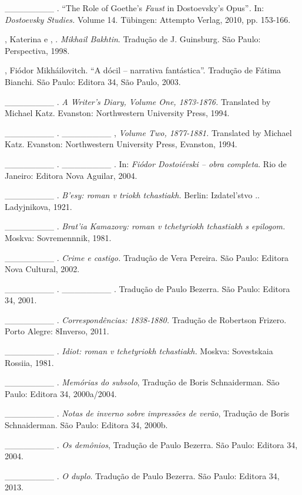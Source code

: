 \begin{Parskip}
\_\_\_\_\_\_\_\_ . ``The Role of Goethe's \emph{Faust} in Dostoevsky's
Opus''\emph{.} In: \emph{Dostoevsky Studies.} Volume 14. Tübingen:
Attempto Verlag, 2010, pp. 153-166.

, Katerina e , . \emph{Mikhail Bakhtin}. Tradução de
J. Guinsburg. São Paulo: Perspectiva, 1998.

, Fiódor Mikháilovitch. ``A dócil -- narrativa fantástica''.
Tradução de Fátima Bianchi. São Paulo: Editora 34, São Paulo, 2003.

\_\_\_\_\_\_\_\_ . \emph{A Writer's Diary, Volume One, 1873-1876.}
Translated by Michael Katz. Evanston: Northwestern University Press,
1994.

\_\_\_\_\_\_\_\_ . \_\_\_\_\_\_\_\_ , \emph{Volume Two, 1877-1881.}
Translated by Michael Katz. Evanston: Northwestern University Press,
Evanston, 1994.

\_\_\_\_\_\_\_\_ . \_\_\_\_\_\_\_\_ . In: \emph{Fiódor Dostoiévski --
obra completa}. Rio de Janeiro: Editora Nova Aguilar, 2004.

\_\_\_\_\_\_\_\_ . \emph{B'esy: roman v triokh tchastiakh.} Berlin:
Izdatel'stvo .. Ladyjnikova, 1921.

\_\_\_\_\_\_\_\_ . \emph{Brat'ia Kamazovy: roman v tchetyriokh
tchastiakh s epilogom.} Moskva: Sovremennnik, 1981.

\_\_\_\_\_\_\_\_ . \emph{Crime e castigo.} Tradução de Vera Pereira. São
Paulo: Editora Nova Cultural, 2002.

\_\_\_\_\_\_\_\_ . \_\_\_\_\_\_\_\_ . Tradução de Paulo Bezerra. São
Paulo: Editora 34, 2001.

\_\_\_\_\_\_\_\_ . \emph{Correspondências: 1838-1880.} Tradução de
Robertson Frizero. Porto Alegre: 8Inverso, 2011.

\_\_\_\_\_\_\_\_ . \emph{Idiot: roman v tchetyriokh tchastiakh.} Moskva:
Sovestskaia Rossiia, 1981.

\_\_\_\_\_\_\_\_ . \emph{Memórias do subsolo}, Tradução de Boris
Schnaiderman. São Paulo: Editora 34, 2000a/2004.

\_\_\_\_\_\_\_\_ . \emph{Notas de inverno sobre impressões de verão},
Tradução de Boris Schnaiderman. São Paulo: Editora 34, 2000b.

\_\_\_\_\_\_\_\_ . \emph{Os demônios}, Tradução de Paulo Bezerra. São
Paulo: Editora 34, 2004.

\_\_\_\_\_\_\_\_ . \emph{O duplo}. Tradução de Paulo Bezerra. São Paulo:
Editora 34, 2013.


\end{Parskip}
